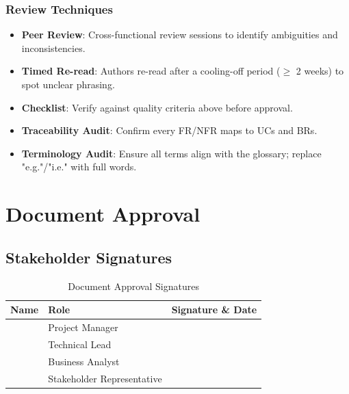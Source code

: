 \documentclass[12pt,a4paper]{article}
\begin{document}
\subsubsection{Review Techniques}
\begin{itemize}
    \item \textbf{Peer Review}: Cross-functional review sessions to identify ambiguities and inconsistencies.
    \item \textbf{Timed Re-read}: Authors re-read after a cooling-off period (\(\geq\) 2 weeks) to spot unclear phrasing.
    \item \textbf{Checklist}: Verify against quality criteria above before approval.
    \item \textbf{Traceability Audit}: Confirm every FR/NFR maps to UCs and BRs.
    \item \textbf{Terminology Audit}: Ensure all terms align with the glossary; replace "e.g."/"i.e." with full words.
\end{itemize}

\section{Document Approval}

\subsection{Stakeholder Signatures}
\begin{table}[H]
\centering
\begin{tabular}{|p{4cm}|p{4cm}|p{4cm}|}
\hline
\textbf{Name} & \textbf{Role} & \textbf{Signature \& Date} \\
\hline
 & Project Manager &  \\
\hline
 & Technical Lead &  \\
\hline
 & Business Analyst &  \\
\hline
 & Stakeholder Representative &  \\
\hline
\end{tabular}
\caption{Document Approval Signatures}
\end{table}
\end{document}
